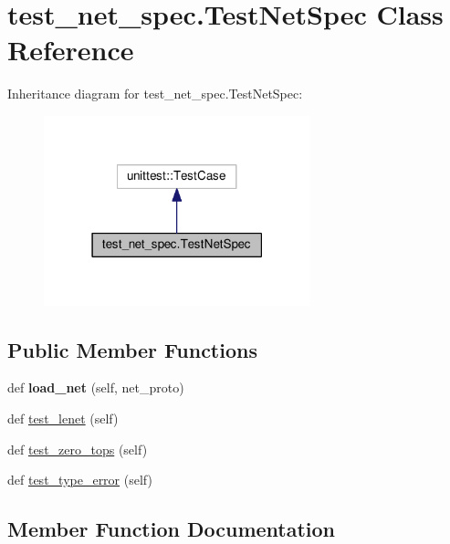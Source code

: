 \hypertarget{classtest__net__spec_1_1_test_net_spec}{}\section{test\+\_\+net\+\_\+spec.\+Test\+Net\+Spec Class Reference}
\label{classtest__net__spec_1_1_test_net_spec}


Inheritance diagram for test\+\_\+net\+\_\+spec.\+Test\+Net\+Spec\+:
\nopagebreak
\begin{figure}[H]
\begin{center}
\leavevmode
\includegraphics[width=219pt]{classtest__net__spec_1_1_test_net_spec__inherit__graph}
\end{center}
\end{figure}
\subsection*{Public Member Functions}
\begin{DoxyCompactItemize}
\item 
\mbox{\label{classtest__net__spec_1_1_test_net_spec_a69e86636e81e1cd799ed76e39e8a1a6b}} 
def {\bfseries load\+\_\+net} (self, net\+\_\+proto)
\item 
def \mbox{\hyperlink{classtest__net__spec_1_1_test_net_spec_ade38b214954610b0074929e832e26330}{test\+\_\+lenet}} (self)
\item 
def \mbox{\hyperlink{classtest__net__spec_1_1_test_net_spec_a91021c09c7d6750cba8a8a1a05749ad6}{test\+\_\+zero\+\_\+tops}} (self)
\item 
def \mbox{\hyperlink{classtest__net__spec_1_1_test_net_spec_a31644344d9edbc6fc7150a555171ec91}{test\+\_\+type\+\_\+error}} (self)
\end{DoxyCompactItemize}


\subsection{Member Function Documentation}
\mbox{\label{classtest__net__spec_1_1_test_net_spec_ade38b214954610b0074929e832e26330}} 
